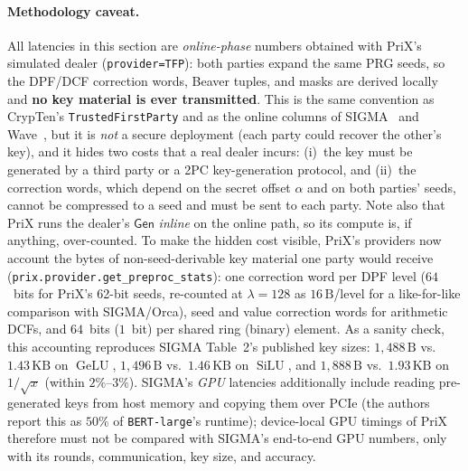 \documentclass[11pt]{article}
\begin{document}
\paragraph{Methodology caveat.} All latencies in this section are \emph{online-phase} numbers obtained with PriX's simulated dealer (\texttt{provider=TFP}): both parties expand the same PRG seeds, so the DPF/DCF correction words, Beaver tuples, and masks are derived locally and \textbf{no key material is ever transmitted}. This is the same convention as CrypTen's \texttt{TrustedFirstParty} and as the online columns of SIGMA~\cite{gupta2024sigma} and Wave~\cite{reis2025wave}, but it is \emph{not} a secure deployment (each party could recover the other's key), and it hides two costs that a real dealer incurs: (i)~the key must be generated by a third party or a 2PC key-generation protocol, and (ii)~the correction words, which depend on the secret offset $\alpha$ and on both parties' seeds, cannot be compressed to a seed and must be sent to each party. Note also that PriX runs the dealer's $\mathsf{Gen}$ \emph{inline} on the online path, so its compute is, if anything, over-counted. To make the hidden cost visible, PriX's providers now account the bytes of non-seed-derivable key material one party would receive (\texttt{prix.provider.get\_preproc\_stats}): one correction word per DPF level ($64$~bits for PriX's 62-bit seeds, re-counted at $\lambda=128$ as $16\,\text{B}$/level for a like-for-like comparison with SIGMA/Orca), seed and value correction words for arithmetic DCFs, and $64$~bits ($1$~bit) per shared ring (binary) element. As a sanity check, this accounting reproduces SIGMA Table~2's published key sizes: $1{,}488\,\text{B}$ vs.\ $1.43\,\text{KB}$ on $\operatorname{GeLU}$, $1{,}496\,\text{B}$ vs.\ $1.46\,\text{KB}$ on $\operatorname{SiLU}$, and $1{,}888\,\text{B}$ vs.\ $1.93\,\text{KB}$ on $1/\sqrt{x}$ (within $2\%$--$3\%$). SIGMA's \emph{GPU} latencies additionally include reading pre-generated keys from host memory and copying them over PCIe (the authors report this as $50\%$ of \texttt{BERT-large}'s runtime); device-local GPU timings of PriX therefore must not be compared with SIGMA's end-to-end GPU numbers, only with its rounds, communication, key size, and accuracy.
\end{document}
